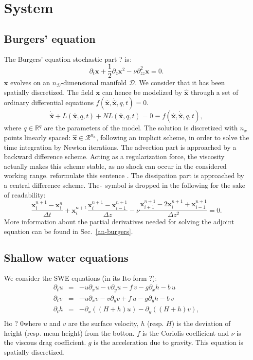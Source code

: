\documentclass[aip,pof,nofootinbib,reprint,onecolumn]{revtex4-1}
\newcommand{\todo}[1]{{\color{red} #1 }}
\newcommand{\gras}[1]{\boldsymbol{#1}}
\newcommand{\mypar}[1]{\left(#1\right)}
\newcommand{\Ephaz}{\mathcal{D}}%
\newcommand{\Nphaz}{n_{\mathcal{D}}} %
\newcommand{\fdyn}{f} %
\newcommand{\point}{\gras{x}} %
\begin{document}
\section{System}
\label{sec-sys}

\subsection{Burgers' equation}
\label{ssec-burgers}
The Burgers' equation \todo{stochastic part ?}is:
$$ \partial_t \point + \frac{1}{2} \partial_z \point^2 - \nu \partial^2_{zz}\point = 0. $$
$\point$ evolves on an $\Nphaz$-dimensional manifold $\Ephaz$. 
We consider that it has been spatially discretized. The field $\point$ can hence be modelized by $\hat{\point}$ through a set of ordinary differential equations $ \fdyn(\hat{\point},\dot{\hat{\point}},q,t) =0.$
$$ \dot{\hat{\point}} + L(\hat{\point},q,t) + NL(\hat{\point},q,t) = 0 \equiv \fdyn(\hat{\point},\dot{\hat{\point}},q,t), $$
where $q\in \mathbb{R}^{q}$ are the parameters of the model.
The solution is discretized with $n_x$ points linearly spaced: $\hat{\point}\in \mathcal{R}^{n_x}$, following an implicit scheme, in order to solve the time integration by Newton iterations. 
The advection part is approached by a backward difference scheme.
Acting as a regularization force, the viscosity actually makes this scheme stable, as no shock can occur in the considered working range. \todo{reformulate this sentence}.
The dissipation part is approached by a central difference scheme.
The $\hat{\,}$ symbol is dropped in the following for the sake of readability:
\begin{equation}
 \frac{\point^{n+1}_i - \point^{n}_i}{\Delta t} + \point^{n+1}_i \frac{\point^{n+1}_i - \point^{n+1}_{i-1}}{\Delta z} - \nu \frac{\point^{n+1}_{i+1} -2 \point^{n+1}_i + \point^{n+1}_{i-1}}{\Delta z ^2} = 0.
\label{eq-fdyn_burgers}
\end{equation}
More information about the partial derivatives needed for solving the adjoint equation can be found in Sec.~\ref{an-burgers}.


\subsection{Shallow water equations}  \label{ssec-swe}
\todo{We consider the \todo{SWE} equations (in its Ito form ?):
\begin{equation}
\begin{array}{lll}
\partial_t u & =& - u \partial_x u - v \partial_y u - f\,v - g \partial_x h -b\,u\\ 
\partial_t v & =& - u \partial_x v - v \partial_y v + f\,u - g \partial_y h -b\,v\\
\partial_t h & =& - \partial_x \mypar{\mypar{H+h}u} - \partial_y \mypar{\mypar{H+h}v}, \\
\end{array}
\label{eq-swe}
\end{equation} 
\todo{Ito ?} 0where $u$ and $v$ are the surface velocity, $h$ (resp. $H$) is the deviation of height (resp. mean height) from the botton. $f$ is the Coriolis coefficient and $\nu$ is the viscous drag coefficient. $g$ is the acceleration due to gravity.
This equation is spatially discretized.}
\end{document}
